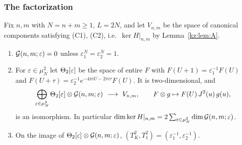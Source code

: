 \subsubsection{The factorization}

\begin{lemma}\label{kz:lem:B}
Fix $n,m$ with $N=n+m\ge1$, $L=2N$, and let $V_{n,m}$ be the space of canonical components satisfying
\textup{(C1)}, \textup{(C2)}, i.e.\ $\ker H|_{n,m}$ by Lemma~\ref{kz:lem:A}.
\begin{enumerate}
\item[(a)] $\mathcal{G}(n,m;\varepsilon)=0$ unless $\varepsilon_1^N=\varepsilon_2^N=1$.
\item[(b)] For $\varepsilon\in\mu_N^2$ let $\Theta_2[\varepsilon]$ be the space of entire $F$ with
$F(U+1)=\varepsilon_1^{-1}F(U)$ and $F(U+\tau)=\varepsilon_2^{-1}e^{-4\pi iU-2\pi i\tau}F(U)$. It is two-dimensional, and
\[
\bigoplus_{\varepsilon\in\mu_N^2}\kzTh_2[\varepsilon]\otimes\kzG(n,m;\varepsilon)\ \longrightarrow\ V_{n,m},\qquad
F\otimes g\mapsto F(U)\,J^2(u)\,g(u),
\]
is an isomorphism. In particular $\dim\ker H|_{n,m}=2\sum_{\varepsilon\in\mu_N^2}\dim\mathcal{G}(n,m;\varepsilon)$.
\item[(c)] On the image of $\Theta_2[\varepsilon]\otimes\mathcal{G}(n,m;\varepsilon)$, $(T_K^2,T_1^2)=(\varepsilon_1^{-1},\varepsilon_2^{-1})$.
\end{enumerate}
\end{lemma}

